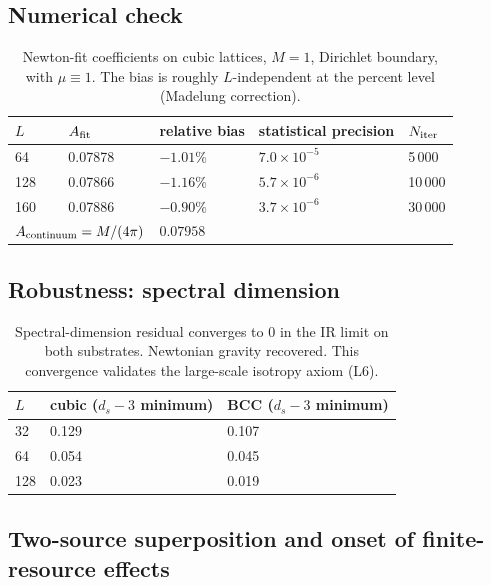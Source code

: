 \documentclass[11pt,a4paper]{article}
\begin{document}
\subsection{Numerical check}

\begin{table}[h]
\centering
\begin{tabular}{lllll}
\toprule
$L$ & $A_{\rm fit}$ & relative bias & statistical precision &
$N_{\rm iter}$\\
\midrule
64  & 0.07878 & $-1.01\%$ & $7.0 \times 10^{-5}$ & 5\,000\\
128 & 0.07866 & $-1.16\%$ & $5.7 \times 10^{-6}$ & 10\,000\\
160 & 0.07886 & $-0.90\%$ & $3.7 \times 10^{-6}$ & 30\,000\\
\midrule
\multicolumn{2}{l}{$A_{\rm continuum} = M/(4\pi)$} & $0.07958$ & & \\
\bottomrule
\end{tabular}
\caption{Newton-fit coefficients on cubic lattices, $M = 1$,
Dirichlet boundary, with $\mu \equiv 1$. The bias is roughly
$L$-independent at the percent level (Madelung correction).}
\label{tab:gres}
\end{table}

\subsection{Robustness: spectral dimension}

\begin{table}[h]
\centering
\begin{tabular}{lll}
\toprule
$L$ & cubic ($d_s - 3$ minimum) & BCC ($d_s - 3$ minimum)\\
\midrule
32  & 0.129 & 0.107\\
64  & 0.054 & 0.045\\
128 & 0.023 & 0.019\\
\bottomrule
\end{tabular}
\caption{Spectral-dimension residual converges to $0$ in the
IR limit on both substrates. Newtonian gravity recovered. This convergence validates the large-scale isotropy axiom (L6).}
\label{tab:dscomp}
\end{table}

\subsection{Two-source superposition and onset of finite-resource effects}
\label{sec:two-source}
\end{document}

